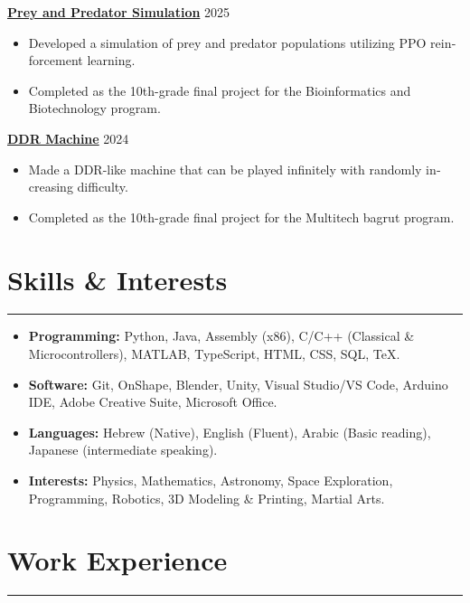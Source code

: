\documentclass[11pt, a4paper]{article}
\begin{document}
\begin{english}
\noindent \textbf{\href{https://github.com/dotRetrd1/BioCode_10th_FinalProject_PredatorVsPrey}{Prey and Predator Simulation}} \hfill 2025
\begin{itemize}[itemsep=2pt, parsep=0pt, topsep=2pt]
    \item Developed a simulation of prey and predator populations utilizing PPO reinforcement learning.
    \item Completed as the 10th-grade final project for the Bioinformatics and Biotechnology program.
\end{itemize}

\vspace{5pt}

\noindent \textbf{\href{https://docs.google.com/presentation/d/1aNJTU6BUvC1FYdzTdPDngVhVzPhTuTnGcDsX0PqvBGc/edit?usp=sharing}{DDR Machine}} \hfill 2024
\begin{itemize}[itemsep=2pt, parsep=0pt, topsep=2pt]
    \item Made a DDR-like machine that can be played infinitely with randomly increasing difficulty.
    \item Completed as the 10th-grade final project for the Multitech bagrut program.
\end{itemize}

\section*{Skills \& Interests}
\hrule \vspace{8pt}
\begin{itemize}[itemsep=2pt, parsep=0pt, topsep=2pt]
    \item \textbf{Programming:} Python, Java, Assembly (x86), C/C++ (Classical \& Microcontrollers), MATLAB, TypeScript, HTML, CSS, SQL, TeX.
    \item \textbf{Software:} Git, OnShape, Blender, Unity, Visual Studio/VS Code, Arduino IDE, Adobe Creative Suite, Microsoft Office.
    \item \textbf{Languages:} Hebrew (Native), English (Fluent), Arabic (Basic reading), Japanese (intermediate speaking).
    \item \textbf{Interests:} Physics, Mathematics, Astronomy, Space Exploration, Programming, Robotics, 3D Modeling \& Printing, Martial Arts.
\end{itemize}

\section*{Work Experience}
\hrule \vspace{8pt}


\end{english}
\end{document}
